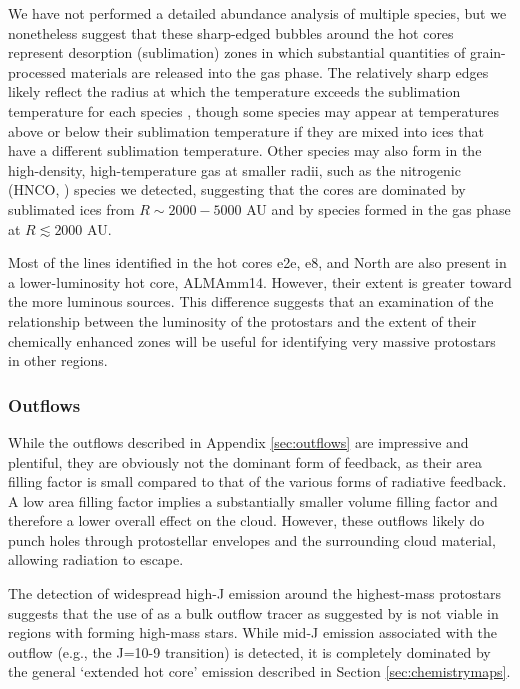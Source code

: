 \documentclass{emulateapj}
\begin{document}
We have not performed a detailed abundance analysis of multiple species, but we
nonetheless suggest that these sharp-edged bubbles around the hot cores
represent desorption (sublimation) zones in which substantial quantities of
grain-processed materials are released into the gas phase.  The relatively
sharp edges likely reflect the radius at which the temperature exceeds
the sublimation temperature for each species \citep{Garrod2006a,Green2009a},
though some species may appear at temperatures above or below their sublimation
temperature if they are mixed into ices that have a different sublimation
temperature.  Other species may also form in the high-density, high-temperature
gas at smaller radii, such as the nitrogenic (HNCO, \formamide) species we
detected, suggesting that the cores are dominated by sublimated ices from
$R\sim2000-5000$ AU and by species formed in the gas phase at $R\lesssim2000$
AU.

Most of the lines identified in the hot cores e2e, e8, and North are also
present in a lower-luminosity hot core, ALMAmm14.  However, their extent is
greater toward the more luminous sources.  This difference suggests that an
examination of the relationship between the luminosity of the protostars and
the extent of their chemically enhanced zones will be useful for identifying
 very massive protostars in other regions.


\subsubsection{Outflows}
\label{sec:outflowdiscussion}
While the outflows described in Appendix \ref{sec:outflows} are impressive and
plentiful, they are obviously not the dominant form of feedback, as their area
filling factor is small compared to that of the various forms of radiative
feedback.  A low area filling factor implies a substantially smaller volume
filling factor and therefore a lower overall effect on the cloud.  However,
these outflows likely do punch holes through protostellar envelopes and the
surrounding cloud material, allowing radiation to escape.

The detection of widespread high-J \methanol emission around the highest-mass
protostars suggests that the use of \methanol as a bulk outflow tracer as
suggested by \citet{Kristensen2015a} is not viable in regions with forming
high-mass stars.  While mid-J \methanol emission associated with
the outflow (e.g., the J=10-9 transition) is detected, it is completely
dominated by the general `extended hot core' emission described in Section
\ref{sec:chemistrymaps}.
\end{document}
